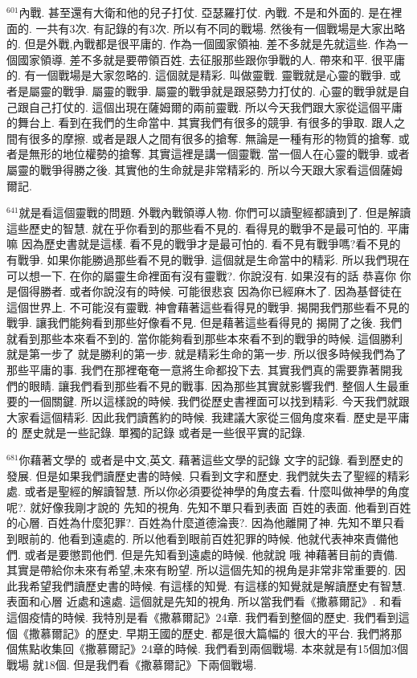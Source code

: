 \documentclass{book}
\begin{document}
$^{601}$內戰.
甚至還有大衛和他的兒子打仗.
亞瑟羅打仗.
內戰.
不是和外面的.
是在裡面的.
一共有3次.
有記錄的有3次.
所以有不同的戰場.
然後有一個戰場是大家出略的.
但是外戰,內戰都是很平庸的.
作為一個國家領袖.
差不多就是先就這些.
作為一個國家領導.
差不多就是要帶領百姓.
去征服那些跟你爭戰的人.
帶來和平.
很平庸的.
有一個戰場是大家忽略的.
這個就是精彩.
叫做靈戰.
靈戰就是心靈的戰爭.
或者是屬靈的戰爭.
屬靈的戰爭.
屬靈的戰爭就是跟惡勢力打仗的.
心靈的戰爭就是自己跟自己打仗的.
這個出現在薩姆爾的兩前靈戰.
所以今天我們跟大家從這個平庸的舞台上.
看到在我們的生命當中.
其實我們有很多的競爭.
有很多的爭取.
跟人之間有很多的摩擦.
或者是跟人之間有很多的搶奪.
無論是一種有形的物質的搶奪.
或者是無形的地位權勢的搶奪.
其實這裡是講一個靈戰.
當一個人在心靈的戰爭.
或者屬靈的戰爭得勝之後.
其實他的生命就是非常精彩的.
所以今天跟大家看這個薩姆爾記.

$^{641}$就是看這個靈戰的問題.
外戰內戰領導人物.
你們可以讀聖經都讀到了.
但是解讀這些歷史的智慧.
就在乎你看到的那些看不見的.
看得見的戰爭不是最可怕的.
平庸嘛 因為歷史書就是這樣.
看不見的戰爭才是最可怕的.
看不見有戰爭嗎?看不見的有戰爭.
如果你能勝過那些看不見的戰爭.
這個就是生命當中的精彩.
所以我們現在可以想一下.
在你的屬靈生命裡面有沒有靈戰?.
你說沒有.
如果沒有的話 恭喜你 你是個得勝者.
或者你說沒有的時候.
可能很悲哀 因為你已經麻木了.
因為基督徒在這個世界上.
不可能沒有靈戰.
神會藉著這些看得見的戰爭.
揭開我們那些看不見的戰爭.
讓我們能夠看到那些好像看不見.
但是藉著這些看得見的 揭開了之後.
我們就看到那些本來看不到的.
當你能夠看到那些本來看不到的戰爭的時候.
這個勝利就是第一步了 就是勝利的第一步.
就是精彩生命的第一步.
所以很多時候我們為了那些平庸的事.
我們在那裡奄奄一意將生命都投下去.
其實我們真的需要靠著開我們的眼睛.
讓我們看到那些看不見的戰事.
因為那些其實就影響我們.
整個人生最重要的一個關鍵.
所以這樣說的時候.
我們從歷史書裡面可以找到精彩.
今天我們就跟大家看這個精彩.
因此我們讀舊約的時候.
我建議大家從三個角度來看.
歷史是平庸的 歷史就是一些記錄.
單獨的記錄 或者是一些很平實的記錄.

$^{681}$你藉著文學的 或者是中文,英文.
藉著這些文學的記錄 文字的記錄.
看到歷史的發展.
但是如果我們讀歷史書的時候.
只看到文字和歷史.
我們就失去了聖經的精彩處.
或者是聖經的解讀智慧.
所以你必須要從神學的角度去看.
什麼叫做神學的角度呢?.
就好像我剛才說的 先知的視角.
先知不單只看到表面 百姓的表面.
他看到百姓的心層.
百姓為什麼犯罪?.
百姓為什麼道德淪喪?.
因為他離開了神.
先知不單只看到眼前的.
他看到遠處的.
所以他看到眼前百姓犯罪的時候.
他就代表神來責備他們.
或者是要懲罰他們.
但是先知看到遠處的時候.
他就說 哦 神藉著目前的責備.
其實是帶給你未來有希望,未來有盼望.
所以這個先知的視角是非常非常重要的.
因此我希望我們讀歷史書的時候.
有這樣的知覺.
有這樣的知覺就是解讀歷史有智慧.
表面和心層 近處和遠處.
這個就是先知的視角.
所以當我們看《撒慕爾記》.
和看這個疫情的時候.
我特別是看《撒慕爾記》24章.
我們看到整個的歷史.
我們看到這個《撒慕爾記》的歷史.
早期王國的歷史.
都是很大篇幅的 很大的平台.
我們將那個焦點收集回《撒慕爾記》24章的時候.
我們看到兩個戰場.
本來就是有15個加3個戰場 就18個.
但是我們看《撒慕爾記》下兩個戰場.
\end{document}
